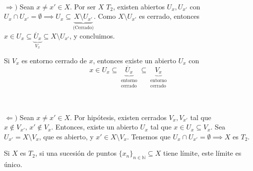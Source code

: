 \begin{dem} \, 
    
    $\Rightarrow)$ Sean $x \ne x' \in X$. Por ser $X$ $T_2$, existen abiertos $U_x, U_{x'}$ con $U_x \cap U_{x'} = \emptyset \implies U_x \subseteq \underbrace{X \setminus U_{x'}}_{\text{(Cerrado)}}$. Como $X \setminus U_{x'}$ es cerrado, entonces $x \in U_x \subseteq \underbrace{\overline{U}_x}_{V_x} \subseteq X \setminus U_{x'}$, y concluimos.
\end{dem}

\begin{obs}
    Si $V_x$ es entorno cerrado de $x$, entonces existe un abierto $U_x$ con $$x \in U_x \subseteq \underbrace{\overline{U}_x}_{\substack{\text{entorno} \\ \text{cerrado}}} \subseteq \underbrace{V_x}_{\substack{\text{entorno} \\ \text{cerrado}}}$$
\end{obs}

\begin{dem} \, 

        $\Leftarrow)$ Sean $x \ne x' \in X$. Por hipótesis, existen cerrados $V_x, V_{x'}$ tal que $x \notin V_{x'}, \, x' \notin V_x$. Entonces, existe un abierto $U_x$ tal que $x \in U_x \subseteq V_x$.      
        Sea $U_{x'} = X \setminus V_x$, que es abierto, y $x' \in X \setminus V_x$. Tenemos que $U_x \cap U_{x'} = \emptyset \implies X$ es $T_2$.
\end{dem}

\begin{prop}
    Si $X$ es $T_2$, si una sucesión de puntos $\{x_n\}_{n \in \mathbb{N}} \subseteq X$ tiene límite, este límite es único.
\end{prop}

